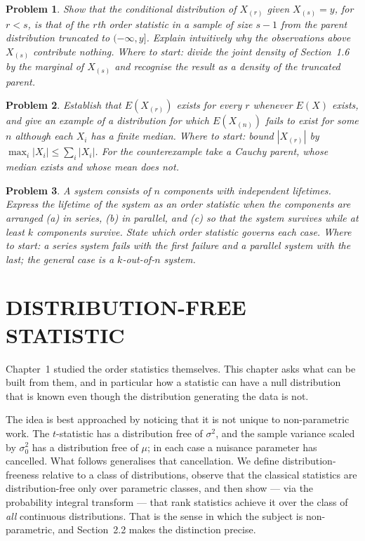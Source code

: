 \documentclass[12pt,a4paper]{report}
\theoremstyle{definition}
\theoremstyle{plain}
\newtheorem{problemx}{Problem}[section]
\newenvironment{problem}{\begin{problemx}}{\end{problemx}}
\begin{document}
\begin{problem}
Show that the conditional distribution of $X_{(r)}$ given $X_{(s)} = y$, for
$r<s$, is that of the $r$th order statistic in a sample of size $s-1$ from the
parent distribution truncated to $(-\infty, y]$. Explain intuitively why the
observations above $X_{(s)}$ contribute nothing.
\emph{Where to start: divide the joint density of Section~1.6 by the marginal of $X_{(s)}$ and recognise the result as a density of the truncated parent.}
\end{problem}

\begin{problem}
Establish that $E\left(X_{(r)}\right)$ exists for every $r$ whenever $E(X)$
exists, and give an example of a distribution for which $E\left(X_{(n)}\right)$
fails to exist for some $n$ although each $X_i$ has a finite median.
\emph{Where to start: bound $|X_{(r)}|$ by $\max_i|X_i|\leq\sum_i|X_i|$. For the counterexample take a Cauchy parent, whose median exists and whose mean does not.}
\end{problem}

\begin{problem}
A system consists of $n$ components with independent lifetimes. Express the
lifetime of the system as an order statistic when the components are arranged
(a) in series, (b) in parallel, and (c) so that the system survives while at
least $k$ components survive. State which order statistic governs each case.
\emph{Where to start: a series system fails with the first failure and a parallel system with the last; the general case is a $k$-out-of-$n$ system.}
\end{problem}


\chapter{DISTRIBUTION-FREE STATISTIC}

Chapter~1 studied the order statistics themselves. This chapter asks what can
be built from them, and in particular how a statistic can have a null
distribution that is known even though the distribution generating the data is
not.

The idea is best approached by noticing that it is not unique to
non-parametric work. The $t$-statistic has a distribution free of $\sigma^{2}$,
and the sample variance scaled by $\sigma^{2}_0$ has a distribution free of
$\mu$; in each case a nuisance parameter has cancelled. What follows generalises
that cancellation. We define distribution-freeness relative to a class of
distributions, observe that the classical statistics are distribution-free only
over parametric classes, and then show --- via the probability integral
transform --- that rank statistics achieve it over the class of \emph{all}
continuous distributions. That is the sense in which the subject is
non-parametric, and Section~2.2 makes the distinction precise.
\end{document}
